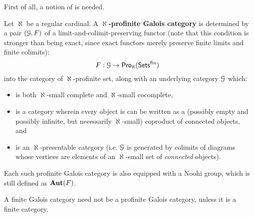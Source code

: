                 First of all, a notion of  is needed.
                \begin{definition} \label{def: profinite_galois_theories}
                    Let $\aleph$ be a regular cardinal. A \textbf{$\aleph$-profinite Galois category} is determined by a pair $(\mathcal{G}, F)$ of a limit-and-colimit-preserving functor (note that this condition is stronger than being exact, since exact functors merely preserve finite limits and finite colimits):
                        $$F: \mathcal{G} \to \mathsf{Pro}_{\aleph}(\mathsf{Sets}^{\mathrm{fin}})$$
                    into the category of $\aleph$-profinite set, along with an underlying category $\mathcal{G}$ which:
                        \begin{itemize}
                            \item is both $\aleph$-small complete and $\aleph$-small cocomplete,
                            \item is a category wherein every object is can be written as a (possibly empty and possibly infinite, but necessarily $\aleph$-small) coproduct of connected objects, and
                            \item is an $\aleph$-presentable category (i.e. $\mathcal{G}$ is generated by colimits of diagrams whose vertices are elements of an $\aleph$-small set of \textit{connected} objects).
                        \end{itemize}
                    Each such profinite Galois category is also equipped with a Noohi group, which is still defined as $\mathbf{Aut}(F)$.
                \end{definition}
                \begin{remark}
                    A finite Galois category need not be a profinite Galois category, unless it is a finite category. 
                \end{remark}
                    
